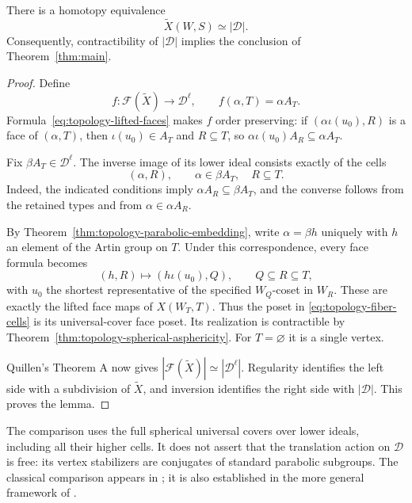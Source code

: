\begin{lemma}
\label{lem:salvetti-comparison}
There is a homotopy equivalence
\[
  \widetilde X(W,S)\simeq|\mathcal D|.
\]
Consequently, contractibility of $|\mathcal D|$ implies the conclusion
of Theorem~\ref{thm:main}.
\end{lemma}

\begin{proof}
Define
\[
  f\colon\mathcal F(\widetilde X)\longrightarrow\mathcal D^{\ell},
  \qquad f(\alpha,T)=\alpha A_T.
\]
Formula~\eqref{eq:topology-lifted-faces} makes $f$ order preserving:
if $(\alpha\iota(u_0),R)$ is a face of $(\alpha,T)$, then
$\iota(u_0)\in A_T$ and $R\subseteq T$, so
$\alpha\iota(u_0)A_R\subseteq\alpha A_T$.

Fix $\beta A_T\in\mathcal D^{\ell}$.  The inverse image of its
lower ideal consists exactly of the cells
\begin{equation}
  (\alpha,R),\qquad \alpha\in\beta A_T,\quad R\subseteq T.
  \label{eq:topology-fiber-cells}
\end{equation}
Indeed, the indicated conditions imply
$\alpha A_R\subseteq\beta A_T$, and the converse follows from the
retained types and from $\alpha\in\alpha A_R$.

By Theorem~\ref{thm:topology-parabolic-embedding}, write
$\alpha=\beta h$ uniquely with $h$ an element of the Artin group on
$T$.  Under this correspondence, every face formula becomes
\[
  (h,R)\longmapsto(h\iota(u_0),Q),
  \qquad Q\subseteq R\subseteq T,
\]
with $u_0$ the shortest representative of the specified $W_Q$-coset
in $W_R$.  These are exactly the lifted face maps of $X(W_T,T)$.
Thus the poset in \eqref{eq:topology-fiber-cells} is its universal-cover
face poset.  Its realization is contractible by
Theorem~\ref{thm:topology-spherical-asphericity}.  For $T=\varnothing$
it is a single vertex.

Quillen's Theorem A now gives
$|\mathcal F(\widetilde X)|\simeq|\mathcal D^{\ell}|$.
Regularity identifies the left side with a subdivision of
$\widetilde X$, and inversion identifies the right side with
$|\mathcal D|$.  This proves the lemma.
\end{proof}

\begin{remark}
The comparison uses the full spherical universal covers over lower
ideals, including all their higher cells.  It does not assert that the
translation action on $\mathcal D$ is free: its vertex stabilizers are
conjugates of standard parabolic subgroups.  The classical comparison appears in
\cite[Corollary~3.2.6]{CharneyDavis1995}; it is also established in the
more general framework of
\cite[Section 3, Theorem 3.1 and Lemma 3.2]{GodelleParis2012}.
\end{remark}

